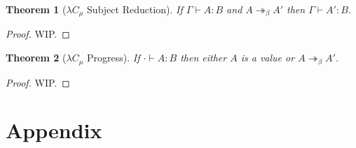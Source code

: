 \documentclass[oneside,a4paper]{article}
\theoremstyle{break}
\newtheorem{thm}{Theorem}[subsection]
\begin{document}
\begin{thm}[$\lambda C_{\mu}$ Subject Reduction]
If $\Gamma \vdash A:B$ and $A \twoheadrightarrow_\beta A'$ then $\Gamma \vdash A':B$.
\end{thm}

\begin{proof}
WIP.
\end{proof}

\begin{thm}[$\lambda C_{\mu}$ Progress]
If $\cdot \vdash A:B$ then either $A$ is a value or $A \twoheadrightarrow_\beta A'$.
\end{thm}

\begin{proof}
WIP.
\end{proof}

\nocite{*}  

\appendix
\section{Appendix}
\end{document}
